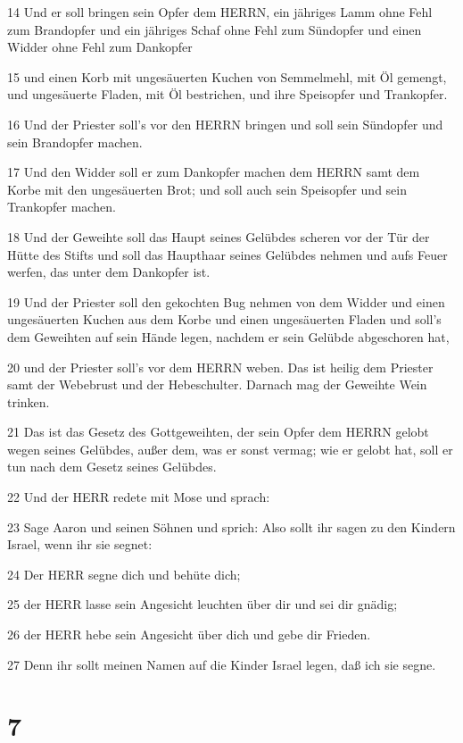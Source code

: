 \par 14 Und er soll bringen sein Opfer dem HERRN, ein jähriges Lamm ohne Fehl zum Brandopfer und ein jähriges Schaf ohne Fehl zum Sündopfer und einen Widder ohne Fehl zum Dankopfer
\par 15 und einen Korb mit ungesäuerten Kuchen von Semmelmehl, mit Öl gemengt, und ungesäuerte Fladen, mit Öl bestrichen, und ihre Speisopfer und Trankopfer.
\par 16 Und der Priester soll's vor den HERRN bringen und soll sein Sündopfer und sein Brandopfer machen.
\par 17 Und den Widder soll er zum Dankopfer machen dem HERRN samt dem Korbe mit den ungesäuerten Brot; und soll auch sein Speisopfer und sein Trankopfer machen.
\par 18 Und der Geweihte soll das Haupt seines Gelübdes scheren vor der Tür der Hütte des Stifts und soll das Haupthaar seines Gelübdes nehmen und aufs Feuer werfen, das unter dem Dankopfer ist.
\par 19 Und der Priester soll den gekochten Bug nehmen von dem Widder und einen ungesäuerten Kuchen aus dem Korbe und einen ungesäuerten Fladen und soll's dem Geweihten auf sein Hände legen, nachdem er sein Gelübde abgeschoren hat,
\par 20 und der Priester soll's vor dem HERRN weben. Das ist heilig dem Priester samt der Webebrust und der Hebeschulter. Darnach mag der Geweihte Wein trinken.
\par 21 Das ist das Gesetz des Gottgeweihten, der sein Opfer dem HERRN gelobt wegen seines Gelübdes, außer dem, was er sonst vermag; wie er gelobt hat, soll er tun nach dem Gesetz seines Gelübdes.
\par 22 Und der HERR redete mit Mose und sprach:
\par 23 Sage Aaron und seinen Söhnen und sprich: Also sollt ihr sagen zu den Kindern Israel, wenn ihr sie segnet:
\par 24 Der HERR segne dich und behüte dich;
\par 25 der HERR lasse sein Angesicht leuchten über dir und sei dir gnädig;
\par 26 der HERR hebe sein Angesicht über dich und gebe dir Frieden.
\par 27 Denn ihr sollt meinen Namen auf die Kinder Israel legen, daß ich sie segne.

\chapter{7}

